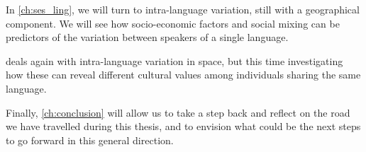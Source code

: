 \documentclass[../thesis.tex]{subfiles}
\begin{document}
In \cref{ch:ses_ling}, we will turn to intra-language variation, still with a
geographical component. We will see how socio-economic factors and social mixing can be
predictors of the variation between speakers of a single language. 

 deals again with intra-language variation in space, but this time
investigating how these can reveal different cultural values among individuals sharing
the same language. 

Finally, \cref{ch:conclusion} will allow us to take a step back and reflect on the road
we have travelled during this thesis, and to envision what could be the next steps to go
forward in this general direction. 
\end{document}
